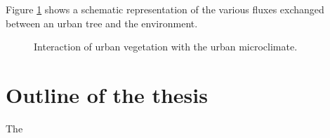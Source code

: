 Figure \ref{fig:vegetation_fluxes} shows a schematic representation of the various fluxes exchanged between an urban tree and the environment. 

\begin{figure}[h]
	\centering
	\caption{Interaction of urban vegetation with the urban microclimate.}
	\label{fig:vegetation_fluxes}
\end{figure}	



\section{Outline of the thesis}

The 